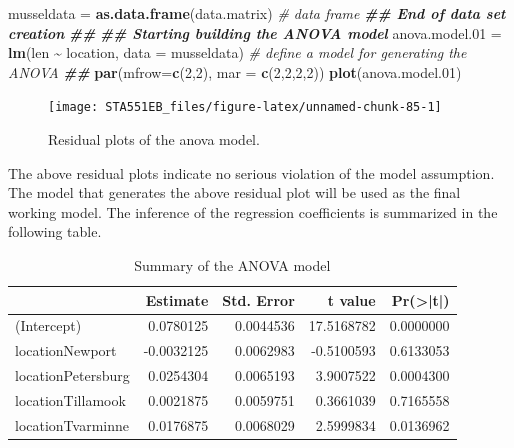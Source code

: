 \documentclass[
]{book}
\newenvironment{Shaded}{\begin{snugshade}}{\end{snugshade}}
\newcommand{\AttributeTok}[1]{\textcolor[rgb]{0.13,0.29,0.53}{#1}}
\newcommand{\CommentTok}[1]{\textcolor[rgb]{0.56,0.35,0.01}{\textit{#1}}}
\newcommand{\DecValTok}[1]{\textcolor[rgb]{0.00,0.00,0.81}{#1}}
\newcommand{\DocumentationTok}[1]{\textcolor[rgb]{0.56,0.35,0.01}{\textbf{\textit{#1}}}}
\newcommand{\FloatTok}[1]{\textcolor[rgb]{0.00,0.00,0.81}{#1}}
\newcommand{\FunctionTok}[1]{\textcolor[rgb]{0.13,0.29,0.53}{\textbf{#1}}}
\newcommand{\NormalTok}[1]{#1}
\newcommand{\OtherTok}[1]{\textcolor[rgb]{0.56,0.35,0.01}{#1}}
\newcommand{\SpecialCharTok}[1]{\textcolor[rgb]{0.81,0.36,0.00}{\textbf{#1}}}
\newcommand{\StringTok}[1]{\textcolor[rgb]{0.31,0.60,0.02}{#1}}
\begin{document}
\begin{Shaded}
\begin{Highlighting}[]
\NormalTok{musseldata }\OtherTok{=} \FunctionTok{as.data.frame}\NormalTok{(data.matrix)        }\CommentTok{\# data frame}
\DocumentationTok{\#\# End of data set creation}
\DocumentationTok{\#\#}
\DocumentationTok{\#\# Starting building the ANOVA model}
\NormalTok{anova.model}\FloatTok{.01} \OtherTok{=} \FunctionTok{lm}\NormalTok{(len }\SpecialCharTok{\textasciitilde{}}\NormalTok{ location, }\AttributeTok{data =}\NormalTok{ musseldata)  }\CommentTok{\# define a model for generating the ANOVA}
\DocumentationTok{\#\#}
\FunctionTok{par}\NormalTok{(}\AttributeTok{mfrow=}\FunctionTok{c}\NormalTok{(}\DecValTok{2}\NormalTok{,}\DecValTok{2}\NormalTok{), }\AttributeTok{mar =} \FunctionTok{c}\NormalTok{(}\DecValTok{2}\NormalTok{,}\DecValTok{2}\NormalTok{,}\DecValTok{2}\NormalTok{,}\DecValTok{2}\NormalTok{))}
\FunctionTok{plot}\NormalTok{(anova.model}\FloatTok{.01}\NormalTok{)}
\end{Highlighting}
\end{Shaded}

\begin{figure}

{\centering \texttt{[image: STA551EB\_files/figure-latex/unnamed-chunk-85-1]} 

}

\caption{Residual plots of the anova model.}\label{fig:unnamed-chunk-85}
\end{figure}

The above residual plots indicate no serious violation of the model assumption. The model that generates the above residual plot will be used as the final working model. The inference of the regression coefficients is summarized in the following table.

\begin{Shaded}
\end{Shaded}

\begin{table}

\caption{\label{tab:unnamed-chunk-86}Summary of the ANOVA model}
\centering
\begin{tabular}[t]{l|r|r|r|r}
\hline
  & Estimate & Std. Error & t value & Pr(>|t|)\\
\hline
(Intercept) & 0.0780125 & 0.0044536 & 17.5168782 & 0.0000000\\
\hline
locationNewport & -0.0032125 & 0.0062983 & -0.5100593 & 0.6133053\\
\hline
locationPetersburg & 0.0254304 & 0.0065193 & 3.9007522 & 0.0004300\\
\hline
locationTillamook & 0.0021875 & 0.0059751 & 0.3661039 & 0.7165558\\
\hline
locationTvarminne & 0.0176875 & 0.0068029 & 2.5999834 & 0.0136962\\
\hline
\end{tabular}
\end{table}
\end{document}
